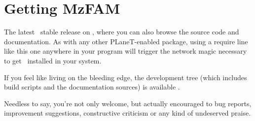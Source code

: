 \section{Getting MzFAM}
\label{sec:getting-mzfam}

The latest \MzFam\ stable release
 on ,
where you can also browse the source code and documentation. As with
any other PLaneT-enabled package, using a require line like this one
anywhere in your program will trigger the network magic necessary
to get \MzFam\ installed in your system.

If you feel like living on the bleeding edge, the development tree
(which includes build scripts and the documentation sources) is
available .

Needless to say, you're not only welcome, but actually encouraged to
 bug reports, improvement
suggestions, constructive criticism or any kind of undeserved praise.


